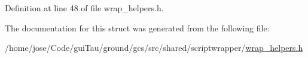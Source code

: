 Definition at line 48 of file wrap\-\_\-helpers.\-h.



The documentation for this struct was generated from the following file\-:\begin{DoxyCompactItemize}
\item 
/home/jose/\-Code/gui\-Tau/ground/gcs/src/shared/scriptwrapper/\hyperlink{wrap__helpers_8h}{wrap\-\_\-helpers.\-h}\end{DoxyCompactItemize}
